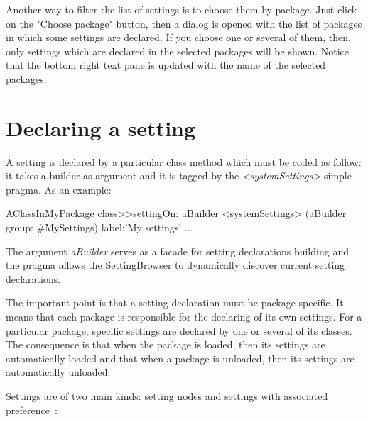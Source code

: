 \documentclass[a4paper,10pt,twoside]{book}
\begin{document}
Another way to filter the list of settings is to choose them by package. Just click on the "Choose package" button, then a dialog is opened with the list of packages in which some settings are declared. If you choose one or several of them, then, only settings which are declared in the selected packages will be shown. Notice that the bottom right text pane is updated with the name of the selected packages.


\section{Declaring a setting}
\label{sec:DeclaringASetting}
A setting is declared by a particular class method which must be coded as follow: it takes a builder as argument and it is tagged by the \textit{<systemSettings>} simple pragma. As an example: 
\begin{code}{}
AClassInMyPackage class>>settingOn: aBuilder
  <systemSettings>
  (aBuilder group: #MySettings)
    label:'My settings' ...
\end{code}
The argument \textit{aBuilder} serves as a facade for setting declarations building and the pragma allows the SettingBrowser to dynamically discover current setting declarations.

The important point is that a setting declaration must be package specific. It means that each package is responsible for the declaring of its own settings. For a particular package, specific settings are declared by one or several of its classes. The consequence is that when the package is loaded, then its settings are automatically loaded and that when a package is unloaded, then its settings are automatically unloaded. 

Settings are of two main kinds: setting nodes and settings with associated preference~: 
\end{document}
